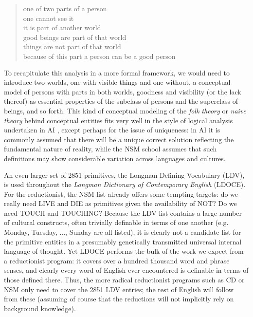 \begin{quote}
one of two parts of a person\\
one cannot see it\\
it is part of another world\\
good beings are part of that world\\
things are not part of that world\\
because of this part a person can be a good person\\
\end{quote}

\noindent 
To recapitulate this analysis in a more formal framework, we would need to
introduce two worlds, one with visible things and one without, a conceptual
model of persons with parts in both worlds, goodness and visibility (or the
lack thereof) as essential properties of the subclass of persons and the
superclass of beings, and so forth. This kind of conceptual modeling of the
{\it folk theory} or {\it naive theory} behind conceptual entities fits very
well in the style of logical analysis undertaken in AI \cite{Hayes:1978},
except perhaps for the issue of uniqueness: in AI it is commonly assumed that
there will be a unique correct solution reflecting the fundamental nature of
reality, while the NSM school assumes that such definitions may show
considerable variation across languages and cultures. 

An even larger set of 2851 primitives, the Longman Defining Vocabulary (LDV),
is used throughout the {\it Longman Dictionary of Contemporary English}
(LDOCE). For the reductionist, the NSM list already offers some tempting
targets: do we really need LIVE and DIE as primitives given the availability
of NOT?  Do we need TOUCH and TOUCHING? Because the LDV list contains a large
number of cultural constructs, often trivially definable in terms of one
another (e.g.  Monday, Tuesday, ..., Sunday are all listed), it is clearly
not a candidate list for the primitive entities in a presumably genetically
transmitted universal internal language of thought. Yet LDOCE performs the
bulk of the work we expect from a reductionist program: it covers over a
hundred thousand word and phrase senses, and clearly every word of English
ever encountered is definable in terms of those defined there. Thus, the more
radical reductionist programs such as CD or NSM only need to cover the 2851
LDV entries; the rest of English will follow from these (assuming of course
that the reductions will not implicitly rely on background knowledge).

